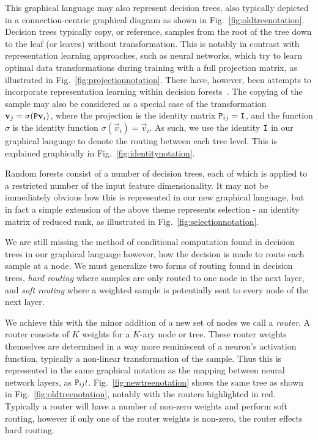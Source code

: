\documentclass[thesis]{subfiles}
\begin{document}
This graphical language may also represent decision trees, also typically depicted in a connection-centric graphical diagram as shown in Fig.~\ref{fig:oldtreenotation}. Decision trees typically copy, or reference, samples from the root of the tree down to the leaf (or leaves) without transformation. This is notably in contrast with representation learning approaches, such as neural networks, which try to learn optimal data transformations during training with a full projection matrix, as illustrated in Fig.~\ref{fig:projectionnotation}. There have, however, been attempts to incorporate representation learning within decision forests~\cite{montillo2011entangled,BuloKontsch2014}. The copying of the sample may also be considered as a special case of the transformation $\vec v_j = \sigma(\mat P \vec v_i)$, where the projection is the identity matrix $\mat P_{ij} = \mat I$, and the function $\sigma$ is the identity function $\sigma(\vec v_i) = \vec v_i$. As such, we use the identity $\mat I$ in our graphical language to denote the routing between each tree level. This is explained graphically in Fig.~\ref{fig:identitynotation}.

Random forests consist of a number of decision trees, each of which is applied to a restricted number of the input feature dimensionality. It may not be immediately obvious how this is represented in our new graphical language, but in fact a simple extension of the above theme represents selection - \ie an identity matrix of reduced rank, as illustrated in Fig.~\ref{fig:selectionnotation}.

We are still missing the method of conditional computation found in decision trees in our graphical language however, \ie how the decision is made to route each sample at a node. We must generalize two forms of routing found in decision trees, \emph{hard routing} where samples are only routed to one node in the next layer, and \emph{soft routing} where a weighted sample is potentially sent to every node of the next layer.

We achieve this with the minor addition of a new set of nodes we call a \emph{router}. A router consists of $K$ weights for a $K$-ary node or tree. These router weights themselves are determined in a way more reminiscent of a neuron's activation function, typically a non-linear transformation of the sample. Thus this is represented in the same graphical notation as the mapping between neural network layers, \ie as $\mat P_{ij} \wr$. Fig.~\ref{fig:newtreenotation} shows the same tree as shown in Fig.~\ref{fig:oldtreenotation}, notably with the routers highlighted in red. Typically a router will have a number of non-zero weights and perform soft routing, however if only one of the router weights is non-zero, the router effects hard routing. 
\end{document}
